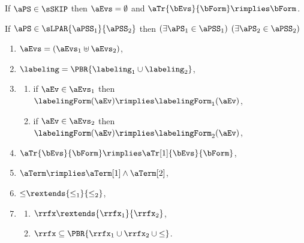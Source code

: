 \begin{definition}
  \noindent
  If $\aPS\in\sSKIP$ then $\aEvs = \emptyset$ and
  $\aTr{\bEvs}{\bForm} \rimplies \bForm$.

  \noindent
  If $\aPS \in \sLPAR{\aPSS_1}{\aPSS_2}$ then  
  $(\exists\aPS_1\in\aPSS_1)$ $(\exists\aPS_2\in\aPSS_2)$
  \begin{multicols}{2}
    \begin{enumerate}[topsep=0pt,label=(\textsc{p}\arabic*),ref=\textsc{p}\arabic*]
    \item \label{par-E}
      $\aEvs = (\aEvs_1\uplus\aEvs_2)$,
    \item \label{par-lambda}
      ${\labeling}=\PBR{{\labeling_1}\cup {\labeling_2}}$, 
    \item[] \label{par-kappa}
      \begin{enumerate}[leftmargin=0pt]
      \item \label{par-kappa1}
        if $\aEv\in\aEvs_1$ then $\labelingForm(\aEv) \rimplies \labelingForm_1(\aEv)$,
      \item \label{par-kappa2}
        if $\aEv\in\aEvs_2$ then $\labelingForm(\aEv) \rimplies \labelingForm_2(\aEv)$,
      \end{enumerate}
    \item \label{par-tau}
      $\aTr{\bEvs}{\bForm} \rimplies \aTr[1]{\bEvs}{\bForm}$,
    \item \label{par-term}
      $\aTerm \rimplies \aTerm[1]\land\aTerm[2]$,
    \item \label{par-le-extends}
      ${\le}\rextends{\le_1}{\le_2}$, 
    \item[] \label{par-rf}
      \begin{enumerate}[leftmargin=0pt]
      \item \label{par-rf-extends}
        ${\rrfx}\rextends{\rrfx_1}{\rrfx_2}$,
      \item \label{par-rf-le}
        ${\rrfx}\subseteq\PBR{{\rrfx_1}\cup{\rrfx_2}\cup{\le}}$.
      \end{enumerate}
    \end{enumerate}
  \end{multicols}
  \medskip


\end{definition}
